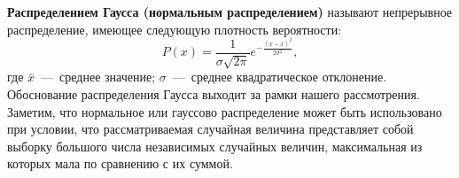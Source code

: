 \documentclass[14pt,a4paper]{article}
\begin{document}
\textbf{Распределением Гаусса (нормальным распределением)} называют непрерывное распределение, имеющее следующую плотность вероятности:\\
\begin{equation} \label{normalDistribution}
    P(x)  = \frac{1}{\sigma \sqrt{2\pi}}e^{-\frac{(x-\bar{x})^2}{2\sigma^2}},
\end{equation}
где $\bar{x}$~---~среднее значение; $\sigma$~---~среднее квадратическое отклонение. Обоснование распределения Гаусса выходит за рамки нашего рассмотрения. Заметим, что нормальное или гауссово распределение может быть использовано при условии, что рассматриваемая случайная величина представляет собой выборку большого числа независимых случайных величин, максимальная из которых мала по сравнению с их суммой.

    
\end{document}
